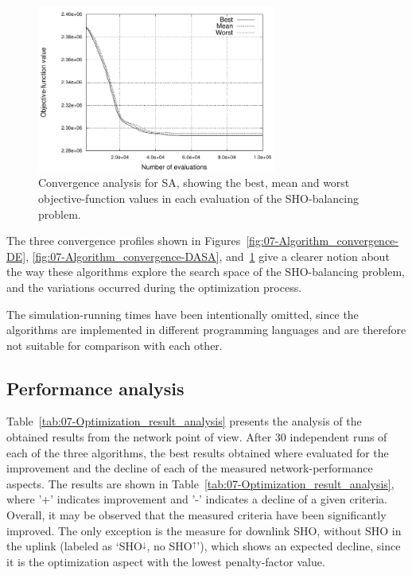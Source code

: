 \begin{figure}[h]
\centering

\includegraphics[width=0.7\textwidth]{07-experimental_evaluation-sho_balancing/img/SA_convergence}

\caption{Convergence analysis for SA, showing the best, mean and worst objective-function
values in each evaluation of the SHO-balancing problem.\label{fig:07-Algorithm_convergence-SA}}
\end{figure}


The three convergence profiles shown in Figures~\ref{fig:07-Algorithm_convergence-DE},
\ref{fig:07-Algorithm_convergence-DASA}, and~\ref{fig:07-Algorithm_convergence-SA}
give a clearer notion about the way these algorithms explore the search
space of the SHO-balancing problem, and the variations occurred during
the optimization process.

The simulation-running times have been intentionally omitted, since
the algorithms are implemented in different programming languages
and are therefore not suitable for comparison with each other.


\subsection{Performance analysis}

Table~\ref{tab:07-Optimization_result_analysis} presents the analysis
of the obtained results from the network point of view. After 30 independent
runs of each of the three algorithms, the best results obtained where
evaluated for the improvement and the decline of each of the measured
network-performance aspects. The results are shown in Table~\ref{tab:07-Optimization_result_analysis},
where '+' indicates improvement and '-' indicates a decline of a given
criteria. Overall, it may be observed that the measured criteria have
been significantly improved. The only exception is the measure for
downlink SHO, without SHO in the uplink (labeled as `SHO$^{\downarrow}$,
no SHO$^{\uparrow}$'), which shows an expected decline, since it
is the optimization aspect with the lowest penalty-factor value.

